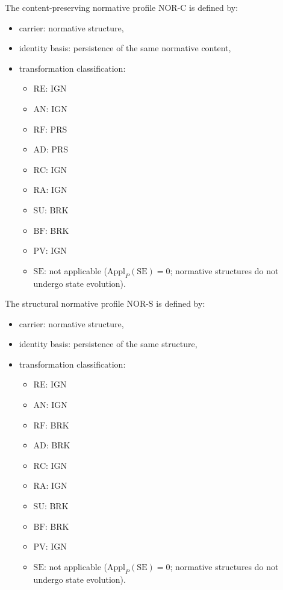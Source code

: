 \begin{definition}
The content-preserving normative profile $\mathrm{NOR\mbox{-}C}$ is defined by:
\begin{itemize}
\item carrier: normative structure,
\item identity basis: persistence of the same normative content,
\item transformation classification:
\begin{itemize}
\item $\mathrm{RE}$: IGN
\item $\mathrm{AN}$: IGN
\item $\mathrm{RF}$: PRS
\item $\mathrm{AD}$: PRS
\item $\mathrm{RC}$: IGN
\item $\mathrm{RA}$: IGN
\item $\mathrm{SU}$: BRK
\item $\mathrm{BF}$: BRK
\item $\mathrm{PV}$: IGN
\item $\mathrm{SE}$: not applicable
      ($\mathrm{Appl}_P(\mathrm{SE}) = 0$;
      normative structures do not undergo state evolution).
\end{itemize}
\end{itemize}
\end{definition}

\begin{definition}
The structural normative profile $\mathrm{NOR\mbox{-}S}$ is defined by:
\begin{itemize}
\item carrier: normative structure,
\item identity basis: persistence of the same structure,
\item transformation classification:
\begin{itemize}
\item $\mathrm{RE}$: IGN
\item $\mathrm{AN}$: IGN
\item $\mathrm{RF}$: BRK
\item $\mathrm{AD}$: BRK
\item $\mathrm{RC}$: IGN
\item $\mathrm{RA}$: IGN
\item $\mathrm{SU}$: BRK
\item $\mathrm{BF}$: BRK
\item $\mathrm{PV}$: IGN
\item $\mathrm{SE}$: not applicable
      ($\mathrm{Appl}_P(\mathrm{SE}) = 0$;
      normative structures do not undergo state evolution).
\end{itemize}
\end{itemize}
\end{definition}


